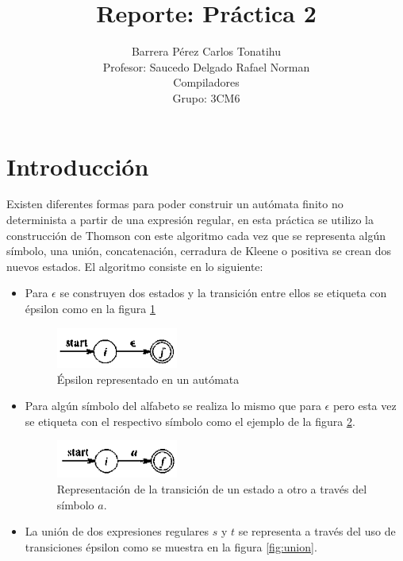 \documentclass[titlepage]{article}
\title{Reporte: Práctica 2}
\author{Barrera Pérez Carlos Tonatihu \\ Profesor: Saucedo Delgado Rafael Norman \\ Compiladores \\ Grupo: 3CM6 }
\begin{document}
  \maketitle
  \tableofcontents
  \newpage
  \section{Introducción}
  Existen diferentes formas para poder construir un autómata finito no determinista a partir de una expresión regular, en esta práctica 
  se utilizo la construcción de Thomson \cite{compis} con este algoritmo cada vez que se representa algún símbolo, una unión, concatenación, 
  cerradura de Kleene o positiva se crean dos nuevos estados. El algoritmo consiste en lo siguiente:
  \begin{itemize}
   \item Para $ \epsilon $ se construyen dos estados y la transición entre ellos se etiqueta con épsilon como en la figura \ref{fig:e}
      \begin{figure}[H]
	\begin{center}
	  \includegraphics[width=4cm]{e.png}
	  \caption{Épsilon representado en un autómata}
	  \label{fig:e}
	\end{center}
      \end{figure}
    \item Para algún símbolo del alfabeto se realiza lo mismo que para $ \epsilon $ pero esta vez se etiqueta con el respectivo símbolo como el ejemplo 
    de la figura \ref{fig:a}.
      \begin{figure}[H]
	\begin{center}
	  \includegraphics[width=4cm]{a.png}
	  \caption{Representación de la transición de un estado a otro a través del símbolo $a$.}
	  \label{fig:a}
	\end{center}
      \end{figure}
    \item La unión de dos expresiones regulares $ s $ y $ t $ se representa a través del uso de transiciones épsilon como se muestra en la figura 
    \ref{fig:union}.
      \begin{figure}[H]
	\begin{center}

\end{center}
\end{figure}
\end{itemize}
\end{document}
